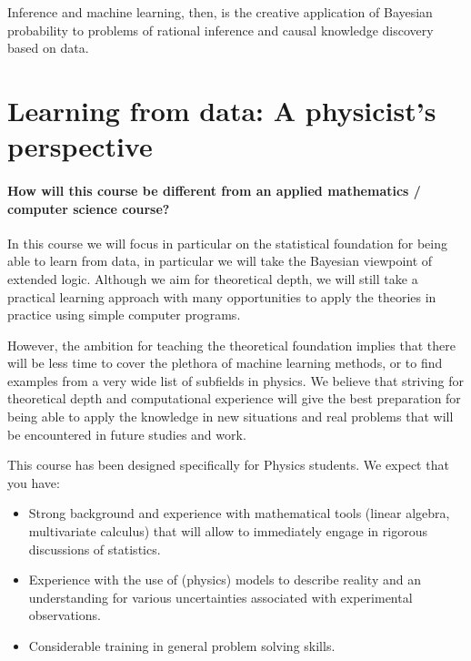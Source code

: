 \documentclass[%
oneside,                 %
final,                   %
10pt]{article}
\newenvironment{summary_mdfboxadmon}[1][]{
\begin{summary_mdfboxmdframed}[frametitle=#1]
}
{
\end{summary_mdfboxmdframed}
}
\begin{document}
\begin{summary_mdfboxadmon}[Summary]
Inference and machine learning, then, is the creative application of
Bayesian probability to problems of rational inference and causal
knowledge discovery based on data.
\end{summary_mdfboxadmon} %



\section{Learning from data: A physicist's perspective}
\paragraph{How will this course be different from an applied mathematics / computer science course?}
In this course we will focus in particular on the statistical foundation for being able to learn from data, in particular we will take the Bayesian viewpoint of extended logic. Although we aim for theoretical depth, we will still take a practical learning approach with many opportunities to apply the theories in practice using simple computer programs. 

However, the ambition for teaching the theoretical foundation implies that there will be less time to cover the plethora of machine learning methods, or to find examples from a very wide list of subfields in physics. We believe that striving for theoretical depth and  computational experience will give the best preparation for being able to apply the knowledge in new situations and real problems that will be encountered in future studies and work. 

This course has been designed specifically for Physics students. We expect that you have:
\begin{itemize}
\item Strong background and experience with mathematical tools (linear algebra, multivariate calculus) that will allow to immediately engage in rigorous discussions of statistics.

\item Experience with the use of (physics) models to describe reality and an understanding for  various uncertainties associated with experimental observations.

\item Considerable training in general problem solving skills.
\end{itemize}
\end{document}
